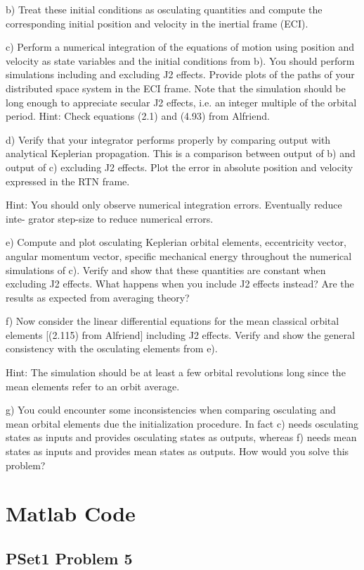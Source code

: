 \documentclass[12pt,a4paper,notitlepage]{article}
\begin{document}
b) Treat these initial conditions as osculating quantities and compute the corresponding
initial position and velocity in the inertial frame (ECI).

c) Perform a numerical integration of the equations of motion using position and velocity
as state variables and the initial conditions from b). You should perform simulations
including and excluding J2 effects. Provide plots of the paths of your distributed space
system in the ECI frame. Note that the simulation should be long enough to appreciate
secular J2 effects, i.e. an integer multiple of the orbital period.
Hint: Check equations (2.1) and (4.93) from Alfriend.

d) Verify that your integrator performs properly by comparing output with analytical
Keplerian propagation. This is a comparison between output of b) and output of c)
excluding J2 effects. Plot the error in absolute position and velocity expressed in the
RTN frame.

Hint: You should only observe numerical integration errors. Eventually reduce inte-
grator step-size to reduce numerical errors.

e) Compute and plot osculating Keplerian orbital elements, eccentricity vector, angular
momentum vector, specific mechanical energy throughout the numerical simulations
of c). Verify and show that these quantities are constant when excluding J2 effects.
What happens when you include J2 effects instead? Are the results as expected from
averaging theory?

f) Now consider the linear differential equations for the mean classical orbital elements
[(2.115) from Alfriend] including J2 effects. Verify and show the general consistency
with the osculating elements from e).

Hint: The simulation should be at least a few orbital revolutions long since the mean
elements refer to an orbit average.

g) You could encounter some inconsistencies when comparing osculating and mean orbital
elements due the initialization procedure. In fact c) needs osculating states as inputs
and provides osculating states as outputs, whereas f) needs mean states as inputs and
provides mean states as outputs. How would you solve this problem?
\newpage
\printbibliography

\newpage
\appendix
\addappheadtotoc
\Large{\bf{\appendixname}}
\section{Matlab Code}
\subsection{PSet1 Problem 5}\label{A:P1p5}


\end{document}

